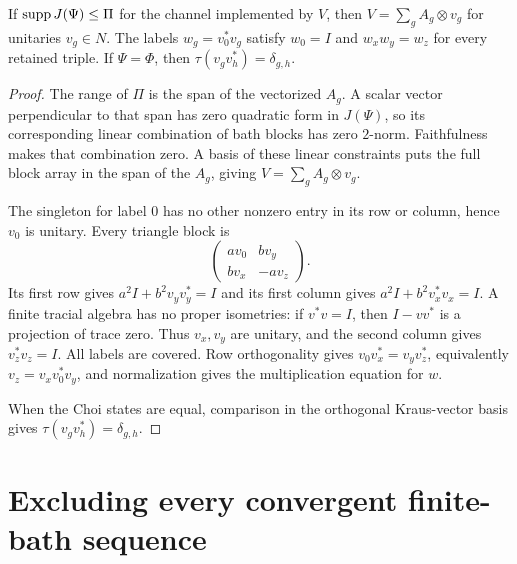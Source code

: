 \begin{lemma}\label{lem:support-extract}
If $\operatorname{supp} J(\Psi)\le\Pi$ for the channel implemented by $V$, then
$V=\sum_gA_g\otimes v_g$ for unitaries $v_g\in N$. The labels
$w_g=v_0^*v_g$ satisfy $w_0=I$ and $w_xw_y=w_z$ for every retained triple.
If $\Psi=\Phi$, then $\tau(v_gv_h^*)=\delta_{g,h}$.
\end{lemma}
\begin{proof}
The range of $\Pi$ is the span of the vectorized $A_g$. A scalar vector perpendicular to
that span has zero quadratic form in $J(\Psi)$, so its corresponding linear combination of
bath blocks has zero $2$-norm. Faithfulness makes that combination zero. A basis of these
linear constraints puts the full block array in the span of the $A_g$, giving
$V=\sum_gA_g\otimes v_g$.

The singleton for label 0 has no other nonzero entry in its row or column, hence $v_0$ is
unitary. Every triangle block is
\[
 \begin{pmatrix}av_0&bv_y\\bv_x&-av_z\end{pmatrix}.
\]
Its first row gives $a^2I+b^2v_yv_y^*=I$ and its first column gives
$a^2I+b^2v_x^*v_x=I$. A finite tracial algebra has no proper isometries: if $v^*v=I$,
then $I-vv^*$ is a projection of trace zero. Thus $v_x,v_y$ are unitary, and the second
column gives $v_z^*v_z=I$. All labels are covered. Row orthogonality gives
$v_0v_x^*=v_yv_z^*$, equivalently $v_z=v_xv_0^*v_y$, and normalization gives the
multiplication equation for $w$.

When the Choi states are equal, comparison in the orthogonal Kraus-vector basis gives
$\tau(v_gv_h^*)=\delta_{g,h}$.
\end{proof}

\section{Excluding every convergent finite-bath sequence}\label{sec:global}

